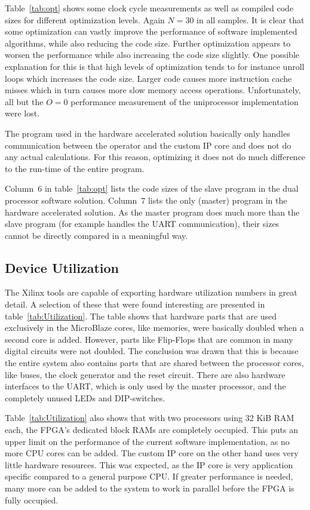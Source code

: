 \documentclass[11pt]{article}
\begin{document}
Table~\ref{tab:opt} shows some clock cycle measurements as well as compiled code sizes for different optimization levels. Again $N=30$ in all samples. It is clear that some optimization can vastly improve the performance of software implemented algorithms, while also reducing the code size. Further optimization appears to worsen the performance while also increasing the code size slightly. One possible explanation for this is that high levels of optimization tends to for instance unroll loops which increases the code size. Larger code causes more instruction cache misses which in turn causes more slow memory access operations. Unfortunately, all but the $O=0$ performance measurement of the uniprocessor implementation were lost.

The program used in the hardware accelerated solution basically only handles communication between the operator and the custom IP core and does not do any actual calculations. For this reason, optimizing it does not do much difference to the run-time of the entire program.

Column~6 in table~\ref{tab:opt} lists the code sizes of the slave program in the dual processor software solution. Column~7 lists the only (master) program in the hardware accelerated solution. As the master program does much more than the slave program (for example handles the UART communication), their sizes cannot be directly compared in a meaningful way.

\subsection{Device Utilization}
The Xilinx tools are capable of exporting hardware utilization numbers in great detail. A selection of these that were found interesting are presented in table~\ref{tab:Utilization}. The table shows that hardware parts that are used exclusively in the MicroBlaze cores, like memories, were basically doubled when a second core is added. However, parts like Flip-Flops that are common in many digital circuits were not doubled. The conclusion was drawn that this is because the entire system also contains parts that are shared between the processor cores, like buses, the clock generator and the reset circuit. There are also hardware interfaces to the UART, which is only used by the master processor, and the completely unused LEDs and DIP-switches.

Table~\ref{tab:Utilization} also shows that with two processors using 32 KiB RAM each, the FPGA's dedicated block RAMs are completely occupied. This puts an upper limit on the performance of the current software implementation, as no more CPU cores can be added. The custom IP core on the other hand uses very little hardware resources. This was expected, as the IP core is very application specific compared to a general purpose CPU. If greater performance is needed, many more can be added to the system to work in parallel before the FPGA is fully occupied.
\end{document}
